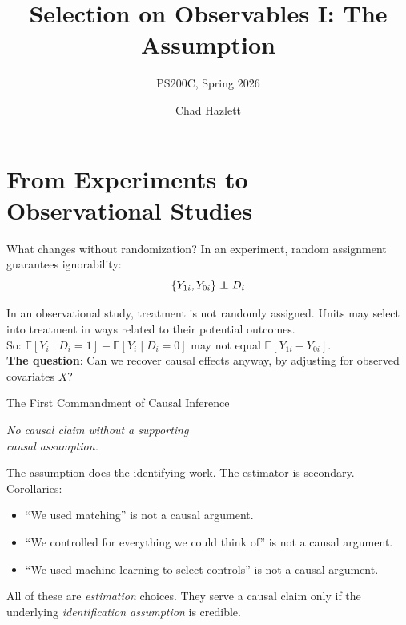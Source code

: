 \documentclass[xcolor=dvipsnames]{beamer}
\title[]{Selection on Observables I: The Assumption}
\subtitle[ ]{PS200C, Spring 2026}
\author[Hazlett]{Chad Hazlett}
\institute[UCLA]{UCLA\\[1ex]
  \texttt{chazlett@ucla.edu}
}
\date{}
\newcommand\E{\mathbb{E}}
\newcommand\indep{\protect\mathpalette{\protect\independenT}{\perp}}
\def\independenT#1#2{\mathrel{\rlap{$#1#2$}\mkern2mu{#1#2}}}
\begin{document}
\begin{frame}
  \titlepage
\end{frame}


\section{From Experiments to Observational Studies}

\begin{frame}{What changes without randomization?}
\small
{} In an experiment, random assignment guarantees ignorability:
$$\{Y_{1i}, Y_{0i}\} \indep D_i$$

 In an observational study, treatment is not randomly assigned.  Units may select into treatment in ways related to their potential outcomes.\\

\medskip
{} So: $\E[Y_i \mid D_i=1] - \E[Y_i \mid D_i=0]$ may not equal $\E[Y_{1i} - Y_{0i}]$.\\

\bigskip
{} \textbf{The question}: Can we recover causal effects anyway, by adjusting for observed covariates $X$?
\end{frame}


\begin{frame}{The First Commandment of Causal Inference}
\small
{}
\begin{center}
\large \textit{No causal claim without a supporting}\\[4pt]
\textit{causal assumption.}
\end{center}

\bigskip
{} The assumption does the identifying work.  The estimator is secondary.\\

\medskip
{} Corollaries:
\begin{itemize}
\footnotesize
\item<3-> ``We used matching'' is not a causal argument.
\item<4-> ``We controlled for everything we could think of'' is not a causal argument.
\item<5-> ``We used machine learning to select controls'' is not a causal argument.
\end{itemize}

\bigskip
{} \small All of these are \textit{estimation} choices.  They serve a causal claim only if the underlying \textit{identification assumption} is credible.
\end{frame}
\end{document}
